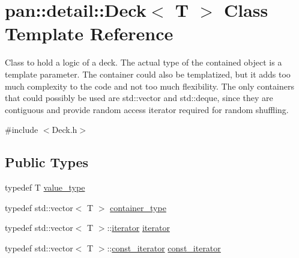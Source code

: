 \hypertarget{classpan_1_1detail_1_1_deck}{}\section{pan\+:\+:detail\+:\+:Deck$<$ T $>$ Class Template Reference}
\label{classpan_1_1detail_1_1_deck}


Class to hold a logic of a deck. The actual type of the contained object is a template parameter. The container could also be templatized, but it adds too much complexity to the code and not too much flexibility. The only containers that could possibly be used are std\+::vector and std\+::deque, since they are contiguous and provide random access iterator required for random shuffling.  




{\ttfamily \#include $<$Deck.\+h$>$}

\subsection*{Public Types}
\begin{DoxyCompactItemize}
\item 
typedef T \hyperlink{classpan_1_1detail_1_1_deck_ac5564d75421f0eb701a2b0b6f4220337}{value\+\_\+type}
\item 
typedef std\+::vector$<$ T $>$ \hyperlink{classpan_1_1detail_1_1_deck_a847d973e0469dd7aef881b3863c37cff}{container\+\_\+type}
\item 
typedef std\+::vector$<$ T $>$\+::\hyperlink{classpan_1_1detail_1_1_deck_a8b4adeae73d035d2bbe3fdfcb65ed1b1}{iterator} \hyperlink{classpan_1_1detail_1_1_deck_a8b4adeae73d035d2bbe3fdfcb65ed1b1}{iterator}
\item 
typedef std\+::vector$<$ T $>$\+::\hyperlink{classpan_1_1detail_1_1_deck_addc18d2f40aa396f6358bb019d088728}{const\+\_\+iterator} \hyperlink{classpan_1_1detail_1_1_deck_addc18d2f40aa396f6358bb019d088728}{const\+\_\+iterator}
\end{DoxyCompactItemize}
